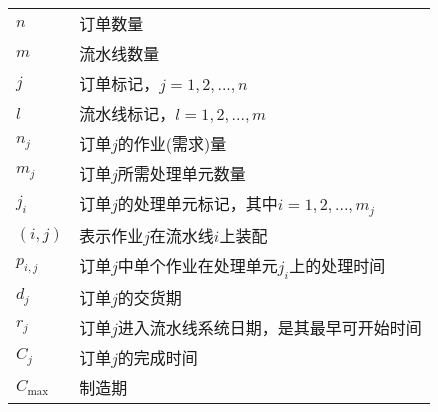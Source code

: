 \begin{center}
\begin{supertabular}{ll}
$n$ & 订单数量\\
$m$ & 流水线数量\\
$j$ & 订单标记，$j = 1,2,...,n$\\
$l$ & 流水线标记，$l = 1,2,...,m$\\
$n_j$ & 订单$j$的作业(需求)量\\
$m_j$ & 订单$j$所需处理单元数量\\
$j_i$ & 订单$j$的处理单元标记，其中$i = 1,2,...,m_j$\\
$(i,j)$ & 表示作业$j$在流水线$i$上装配\\
$p_{i,j}$ & 订单$j$中单个作业在处理单元$j_i$上的处理时间\\
$d_j$ & 订单$j$的交货期\\
$r_j$ & 订单$j$进入流水线系统日期，是其最早可开始时间\\
$C_j$ & 订单$j$的完成时间\\
$C_{\max}$ & 制造期\\


\end{supertabular}
\end{center}
